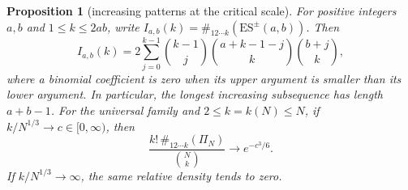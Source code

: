 \documentclass[11pt,letterpaper]{article}
\newtheorem{proposition}[theorem]{Proposition}
\begin{document}
\begin{proposition}[increasing patterns at the critical scale]
\label{prop:increasing-threshold}
For positive integers $a,b$ and $1\le k\le2ab$, write
$I_{a,b}(k)=\#_{12\cdots k}(\mathrm{ES}^{\pm}(a,b))$. Then
\begin{equation}\label{eq:increasing-exact}
 I_{a,b}(k)=2\sum_{j=0}^{k-1}\binom{k-1}{j}
       \binom{a+k-1-j}{k}\binom{b+j}{k},
\end{equation}
where a binomial coefficient is zero when its upper argument is smaller
than its lower argument. In particular, the longest increasing subsequence
has length $a+b-1$. For the universal family and $2\le k=k(N)\le N$, if $k/N^{1/3}\to c\in[0,\infty)$,
then
\begin{equation}\label{eq:increasing-critical}
 \frac{k!\,\#_{12\cdots k}(\Pi_N)}{\binom Nk}\longrightarrow e^{-c^3/6}.
\end{equation}
If $k/N^{1/3}\to\infty$, the same relative density tends to zero.
\end{proposition}
\end{document}
